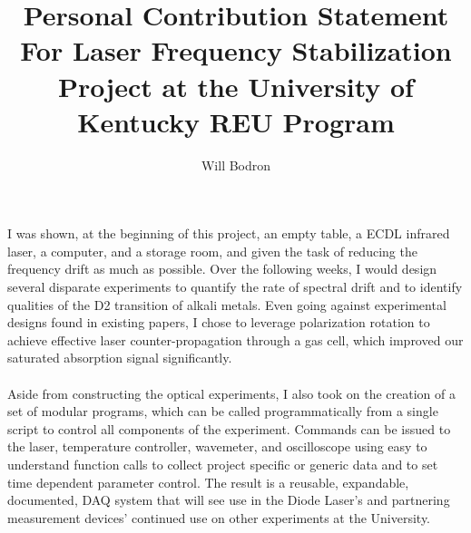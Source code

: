 \documentclass[12pt]{article}
\title{Personal Contribution Statement \\\large For Laser Frequency Stabilization Project at the University of Kentucky REU Program}
\author{Will Bodron}
\begin{document}
  \maketitle
  \paragraph{} I was shown, at the beginning of this project, an empty table, a ECDL infrared laser, a computer, and a storage room, and given the task of reducing the frequency drift as much as possible. Over the following weeks, I would design several disparate experiments to quantify the rate of spectral drift and to identify qualities of the D2 transition of alkali metals. Even going against experimental designs found in existing papers, I chose to leverage polarization rotation to achieve effective laser counter-propagation through a gas cell, which improved our saturated absorption signal significantly. 
  \paragraph{} Aside from constructing the optical experiments, I also took on the creation of a set of modular programs, which can be called programmatically from a single script to control all components of the experiment. Commands can be issued to the laser, temperature controller, wavemeter, and oscilloscope using easy to understand function calls to collect project specific or generic data and to set time dependent parameter control. The result is a reusable, expandable, documented, DAQ system that will see use in the Diode Laser's and partnering measurement devices' continued use on other experiments at the University.
\end{document}

